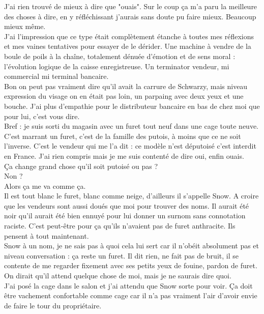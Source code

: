 J'ai rien trouvé de mieux à dire que "ouais". Sur le coup ça m'a paru la meilleure des choses à dire, en y réfléchissant j'aurais sans doute pu faire mieux. Beaucoup mieux même.\\
J'ai l'impression que ce type était complètement étanche à toutes mes réflexions et mes vaines tentatives pour essayer de le dérider. Une machine à vendre de la boule de poils à la chaîne, totalement dénuée d'émotion et de sens moral : l'évolution logique de la caisse enregistreuse. Un terminator vendeur, mi commercial mi terminal bancaire.\\
Bon on peut pas vraiment dire qu'il avait la carrure de Schwarzy, mais niveau expression du visage on en était pas loin, un parpaing avec deux yeux et une bouche. J'ai plus d'empathie pour le distributeur bancaire en bas de chez moi que pour lui, c'est vous dire. \\
Bref : je suis sorti du magasin avec un furet tout neuf dans une cage toute neuve. \\

C'est marrant un furet, c'est de la famille des putois, à moins que ce ne soit l'inverse. C'est le vendeur qui me l'a dit : ce modèle n'est députoisé c'est interdit en France. J'ai rien compris mais je me suis contenté de dire oui, enfin ouais.\\
Ça change grand chose qu'il soit putoisé ou pas ? \\
Non ? \\
Alors ça me va comme ça. \\

Il est tout blanc le furet, blanc comme neige, d'ailleurs il s'appelle Snow. A croire que les vendeurs sont aussi doués que moi pour trouver des noms. Il aurait été noir qu'il aurait été bien ennuyé pour lui donner un surnom sans connotation raciste. C'est peut-être pour ça qu'ils n'avaient pas de furet anthracite. Ils pensent à tout maintenant. \\
Snow à un nom, je ne sais pas à quoi cela lui sert car il n'obéit absolument pas et niveau conversation : ça reste un furet. Il dit rien, ne fait pas de bruit, il se contente de me regarder fixement avec ses petits yeux de fouine, pardon de furet. On dirait qu'il attend quelque chose de moi, mais je ne saurais dire quoi. \\

J'ai posé la cage dans le salon et j'ai attendu que Snow sorte pour voir. Ça doit être vachement confortable comme cage car il n'a pas vraiment l'air d'avoir envie de faire le tour du propriétaire. \\

